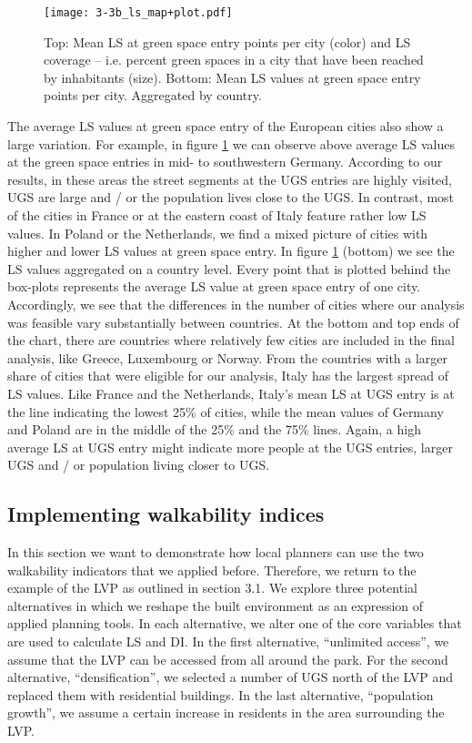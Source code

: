 \documentclass[10pt]{article}
\begin{document}
\begin{figure}
\centering
\texttt{[image: 3-3b\_ls\_map+plot.pdf]}
\caption{Top: Mean LS at green space entry points per city (color) and LS coverage – i.e. percent green spaces in a city that have been reached by inhabitants (size). Bottom: Mean LS values at green space entry points per city. Aggregated by country.}
\label{fig:lsmap}
\end{figure}

The average LS values at green space entry of the European cities also show a large variation.
For example, in figure \ref{fig:lsmap} we can observe above average LS values at the green space entries in mid- to southwestern Germany.
According to our results, in these areas the street segments at the UGS entries are highly visited, UGS are large and / or the population lives close to the UGS. 
In contrast, most of the cities in France or at the eastern coast of Italy feature rather low LS values.  
In Poland or the Netherlands, we find a mixed picture of cities with higher and lower LS values at green space entry.
In figure \ref{fig:lsmap} (bottom) we see the LS values aggregated on a country level. 
Every point that is plotted behind the box-plots represents the average LS value at green space entry of one city.
Accordingly, we see that the differences in the number of cities where our analysis was feasible vary substantially between countries.
At the bottom and top ends of the chart, there are countries where relatively few cities are included in the final analysis, like Greece, Luxembourg or Norway.
From the countries with a larger share of cities that were eligible for our analysis, Italy has the largest spread of LS values.
Like France and the Netherlands, Italy’s mean LS at UGS entry is at the line indicating the lowest 25\% of cities, while the mean values of Germany and Poland are in the middle of the 25\% and the 75\% lines.
Again, a high average LS at UGS entry might indicate more people at the UGS entries, larger UGS and / or population living closer to UGS.


\subsection{Implementing walkability indices}
In this section we want to demonstrate how local planners can use the two walkability indicators that we applied before.
Therefore, we return to the example of the LVP as outlined in section 3.1.
We explore three potential alternatives in which we reshape the built environment as an expression of applied planning tools.
In each alternative, we alter one of the core variables that are used to calculate LS and DI.
In the first alternative, “unlimited access”, we assume that the LVP can be accessed from all around the park.
For the second alternative, “densification”, we selected a number of UGS north of the LVP and replaced them with residential buildings.
In the last alternative, “population growth”, we assume a certain increase in residents in the area surrounding the LVP.
\end{document}
